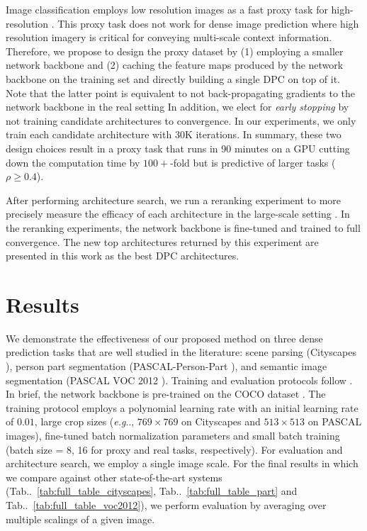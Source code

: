 \documentclass{article}
\makeatletter
\def\@onedot{\ifx\@let@token.\else.\null\fi\xspace}
\DeclareRobustCommand\onedot{\futurelet\@let@token\@onedot}
\newcommand{\tabref}[1]{Tab\onedot~\ref{#1}}
\def\eg{\emph{e.g}\onedot} \def\Eg{\emph{E.g}\onedot}
\makeatother
\begin{document}
Image classification employs low resolution images \cite{krizhevsky2009learning} as a fast proxy task for high-resolution \cite{ILSVRC15}. This proxy task does not work for dense image prediction where high resolution imagery is critical for conveying multi-scale context information.
Therefore, we propose to design the proxy dataset by (1) employing a smaller network backbone and (2) caching the feature maps produced by the network backbone on the training set and directly building a single DPC on top of it. Note that the latter point is equivalent to not back-propagating gradients to the network backbone in the real setting
In addition, we elect for {\it early stopping} by not training candidate architectures to convergence. In our experiments, we only train each candidate architecture with 30K iterations. In summary, these two design choices result in a proxy task that runs in 90 minutes on a GPU cutting down the computation time by $100+$-fold but is predictive of larger tasks ($\rho \geq 0.4$).

After performing architecture search, we run a reranking experiment to more precisely measure the efficacy of each architecture in the large-scale setting \cite{zoph2017neural,zoph2017learning, real2018regularized}. In the reranking experiments, the network backbone is fine-tuned and trained to  full convergence. The new top architectures returned by this experiment are presented in this work as the best DPC architectures.
 \section{Results}
\label{sec:experiments}

We demonstrate the effectiveness of our proposed method on three dense prediction tasks that are well studied in the literature:
scene parsing (Cityscapes \cite{Cordts2016Cityscapes}), person part segmentation (PASCAL-Person-Part \cite{chen_cvpr14}),
and semantic image segmentation (PASCAL VOC 2012 \cite{everingham2014pascal}). Training and evaluation protocols follow \cite{chen2017rethinking, deeplabv3plus2018}. In brief, the network backbone is pre-trained on the COCO dataset \cite{lin2014microsoft}. The training protocol employs a polynomial learning rate \cite{liu2015parsenet} with an initial learning rate of $0.01$, large crop sizes (\eg, $769\times769$ on Cityscapes and $513\times513$ on PASCAL images), fine-tuned batch normalization parameters \cite{ioffe2015batch} and small batch training (batch size = 8, 16 for proxy and real tasks, respectively). For evaluation and architecture search, we employ a single image scale. For the final results in which we compare against other state-of-the-art systems (\tabref{tab:full_table_cityscapes}, \tabref{tab:full_table_part} and \tabref{tab:full_table_voc2012}), we perform evaluation by averaging over multiple scalings of a given image.
\end{document}
